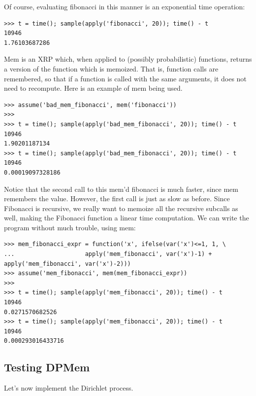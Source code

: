 \documentclass[11pt]{article}
\begin{document}
\noindent Of course, evaluating fibonacci in this manner is an exponential time operation:

\begin{small}
\begin{verbatim}
>>> t = time(); sample(apply('fibonacci', 20)); time() - t
10946
1.76103687286
\end{verbatim}
\end{small}

\noindent Mem is an XRP which, when applied to (possibly probabilistic) functions, returns a version of the function which is memoized.  That is, function calls are remembered, so that if a function is called with the same arguments, it does not need to recompute.  Here is an example of mem being used.

\begin{small}
\begin{verbatim}
>>> assume('bad_mem_fibonacci', mem('fibonacci'))
>>>
>>> t = time(); sample(apply('bad_mem_fibonacci', 20)); time() - t
10946
1.90201187134
>>> t = time(); sample(apply('bad_mem_fibonacci', 20)); time() - t
10946
0.00019097328186
\end{verbatim}
\end{small}

\noindent Notice that the second call to this mem'd fibonacci is much faster, since mem remembers the value.  However, the first call is just as slow as before.  Since Fibonacci is recursive, we really want to memoize all the recursive subcalls as well, making the Fibonacci function a linear time computation.  We can write the program without much trouble, using mem:

\begin{small}
\begin{verbatim}
>>> mem_fibonacci_expr = function('x', ifelse(var('x')<=1, 1, \
...                    apply('mem_fibonacci', var('x')-1) + apply('mem_fibonacci', var('x')-2)))
>>> assume('mem_fibonacci', mem(mem_fibonacci_expr))
>>>
>>> t = time(); sample(apply('mem_fibonacci', 20)); time() - t
10946
0.0271570682526
>>> t = time(); sample(apply('mem_fibonacci', 20)); time() - t
10946
0.000293016433716
\end{verbatim}
\end{small}

\subsection{Testing DPMem}

Let's now implement the Dirichlet process.  
\end{document}
